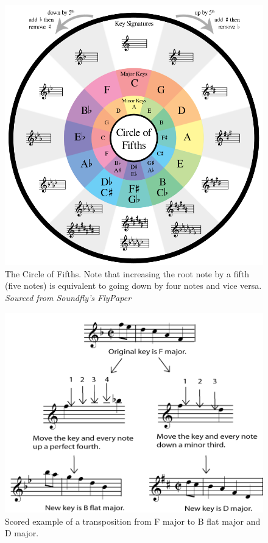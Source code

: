 \documentclass[12pt,]{article}
\begin{document}
\begin{figure}
\centering
\includegraphics[width=\textwidth,height=0.4\textheight]{Images/flypaperfifths.png}
\caption{The Circle of Fifths. Note that increasing the root note by a
fifth (five notes) is equivalent to going down by four notes and vice
versa. \newline\textit{Sourced from Soundfly's FlyPaper}}
\end{figure}

\begin{figure}
\centering
\includegraphics[width=\textwidth,height=0.3\textheight]{Images/transp3b.png}
\caption{Scored example of a transposition from F major to B flat major
and D major.}
\end{figure}
\end{document}
